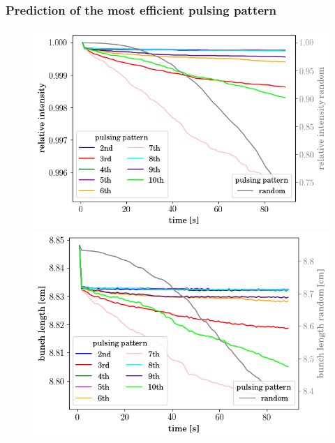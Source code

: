 \documentclass[%
 reprint,
 amsmath,amssymb,
 aps,
prstab,
]{revtex4-1}
\begin{document}
\subsubsection{Prediction of the most efficient pulsing pattern\label{sec:pattern}}
\begin{figure}[h]
	\begin{minipage}[t]{0.49\linewidth}
		\centering
		\includegraphics[width=1.0\linewidth]{2016injerra2b2u_pattern_3_5um_intensity.png}
	\end{minipage}
	\begin{minipage}[t]{0.49\linewidth}
		\centering
		\includegraphics[width=1.0\linewidth]{2016injerra2b2u_pattern_3_5um_sigm.png}
	\end{minipage}	
	\begin{minipage}[t]{0.49\linewidth}
		\centering

\end{minipage}
\end{figure}
\end{document}
